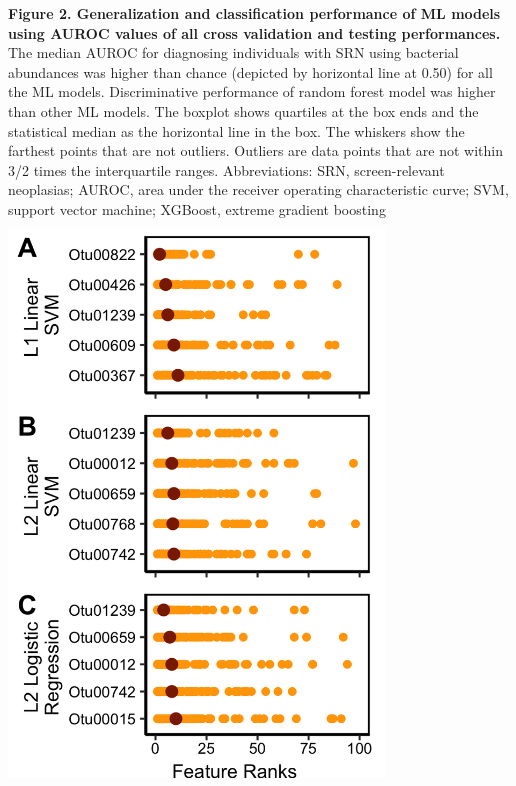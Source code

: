 \documentclass[11pt,]{article}
\begin{document}
\textbf{Figure 2. Generalization and classification performance of ML
models using AUROC values of all cross validation and testing
performances. } The median AUROC for diagnosing individuals with SRN
using bacterial abundances was higher than chance (depicted by
horizontal line at 0.50) for all the ML models. Discriminative
performance of random forest model was higher than other ML models. The
boxplot shows quartiles at the box ends and the statistical median as
the horizontal line in the box. The whiskers show the farthest points
that are not outliers. Outliers are data points that are not within 3/2
times the interquartile ranges. Abbreviations: SRN, screen-relevant
neoplasias; AUROC, area under the receiver operating characteristic
curve; SVM, support vector machine; XGBoost, extreme gradient boosting
\newpage
\includegraphics[height=15cm, width=10cm]{Figure_3.png}
\end{document}
